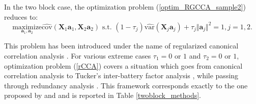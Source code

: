 \documentclass[
]{jss}
\begin{document}
In the two block case, the optimization problem
(\ref{optim_RGCCA_sample2}) reduces to: \begin{equation}
\underset{ \mathbf a_1,  \mathbf a_2}{\text{maximize}} \widehat{\text{
cov}}\left(\mathbf X_1 \mathbf a_1, \mathbf X_2 \mathbf a_2 \right) \text{ s.t. } (1-\tau_j)\widehat{\text{var}}(\mathbf X_j \mathbf a_j) + \tau_j
\Vert  \mathbf a_j \Vert^2 = 1, j =1,2.
\label{rCCA} 
\end{equation}

This problem has been introduced under the name of regularized canonical
correlation analysis \citep{Vinod1976, Leurgans1993, Shawe2004}. For
various extreme cases \(\tau_1 = 0\) or \(1\) and \(\tau_2 = 0\) or
\(1\), optimization problem (\ref{rCCA}) covers a situation which goes
from canonical correlation analysis \citep{Hotelling1933} to Tucker's
inter-battery factor analysis \citep{Tucker1958}, while passing through
redundancy analysis \citep{Wollenberg1977}. This framework corresponds
exactly to the one proposed by \cite{Borga1997} and \cite{Burnham1996}
and is reported in Table \ref{twoblock_methods}.
\end{document}

